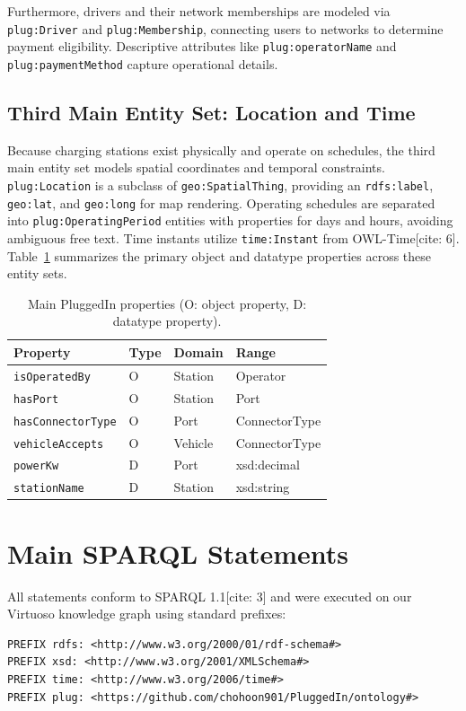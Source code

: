 \documentclass[sigconf]{acmart}
\begin{document}
Furthermore, drivers and their network memberships are modeled via \texttt{plug:Driver} and \texttt{plug:Membership}, connecting users to networks to determine payment eligibility. Descriptive attributes like \texttt{plug:operatorName} and \texttt{plug:paymentMethod} capture operational details.

\subsection{Third Main Entity Set: Location and Time}
Because charging stations exist physically and operate on schedules, the third main entity set models spatial coordinates and temporal constraints. \texttt{plug:Location} is a subclass of \texttt{geo:SpatialThing}, providing an \texttt{rdfs:label}, \texttt{geo:lat}, and \texttt{geo:long} for map rendering. Operating schedules are separated into \texttt{plug:OperatingPeriod} entities with properties for days and hours, avoiding ambiguous free text. Time instants utilize \texttt{time:Instant} from OWL-Time[cite: 6]. Table~\ref{tab:properties} summarizes the primary object and datatype properties across these entity sets.

\begin{table}[h]
\centering
\small
\caption{Main PluggedIn properties (O: object property, D: datatype property).}
\label{tab:properties}
\begin{tabular}{llll}
\toprule
\textbf{Property} & \textbf{Type} & \textbf{Domain} & \textbf{Range} \\
\midrule
\texttt{isOperatedBy} & O & Station & Operator \\
\texttt{hasPort} & O & Station & Port \\
\texttt{hasConnectorType} & O & Port & ConnectorType \\
\texttt{vehicleAccepts} & O & Vehicle & ConnectorType \\
\texttt{powerKw} & D & Port & xsd:decimal \\
\texttt{stationName} & D & Station & xsd:string \\
\bottomrule
\end{tabular}
\end{table}

\section{Main SPARQL Statements}
All statements conform to SPARQL 1.1[cite: 3] and were executed on our Virtuoso knowledge graph using standard prefixes:
\begin{lstlisting}[language=sparql]
PREFIX rdfs: <http://www.w3.org/2000/01/rdf-schema#>
PREFIX xsd: <http://www.w3.org/2001/XMLSchema#>
PREFIX time: <http://www.w3.org/2006/time#>
PREFIX plug: <https://github.com/chohoon901/PluggedIn/ontology#>
\end{lstlisting}
\end{document}
